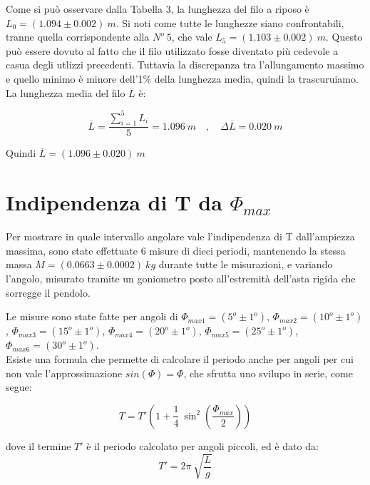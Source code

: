 \documentclass[12pt, a4paper]{article}
\begin{document}
Come si può osservare dalla Tabella 3, la lunghezza del filo a riposo è $L_0=(1.094\pm0.002)\ m$. Si noti come tutte le lunghezze siano confrontabili, tranne quella corrispondente alla $N^o\ 5$, che vale $L_5=(1.103\pm0.002)\ m$. Questo può essere dovuto al fatto che il filo utilizzato fosse diventato più cedevole a casua degli utlizzi precedenti. Tuttavia la discrepanza tra l'allungamento massimo e quello minimo è minore dell'1\% della lunghezza media, quindi la trascuruiamo.\\

La lunghezza media del filo $\overline{L}$ è:

\begin{equation*}
    \overline{L}=\frac{\sum_{i=1}^{5}L_i}{5}=1.096\ m \quad , \quad
    \Delta \overline{L}=0.020\ m
\end{equation*}
\bigskip

Quindi $\overline{L}=(1.096\pm0.020)\ m$







\section{Indipendenza di T da $\Phi_{max}$}
\label{Indip T da angolo}

Per mostrare in quale intervallo angolare vale l'indipendenza di T dall'ampiezza massima, sono state effettuate 6 misure di dieci periodi, mantenendo la stessa massa $M=(0.0663\pm0.0002)\ kg$ durante tutte le misurazioni, e variando l'angolo, misurato tramite un goniometro posto all'estremità dell'asta rigida che sorregge il pendolo. 
\bigskip

Le misure sono state fatte per angoli di $\Phi_{max1}=(5^o\pm1^o)$, $\Phi_{max2}=(10^o\pm1^o)$, $\Phi_{max3}=(15^o\pm1^o)$, $\Phi_{max4}=(20^o\pm1^o)$, $\Phi_{max5}=(25^o\pm1^o)$, $\Phi_{max6}=(30^o\pm1^o)$.\\

Esiste una formula che permette di calcolare il periodo anche per angoli per cui non vale l'approssimazione $sin(\Phi) = \Phi$, che sfrutta uno svilupo in serie, come segue:

\begin{equation}\label{sviluppo periodo}
    T=T' \left(1+\frac{1}{4}\ \sin^2{\left(\frac{\Phi_{max}}{2}\right)}\right)
\end{equation}

dove il termine $T'$ è il periodo calcolato per angoli piccoli, ed è dato da:
\begin{equation}
T'=2\pi\ \sqrt{\frac{{L}}{g}}
\end{equation}
\bigskip
\end{document}
